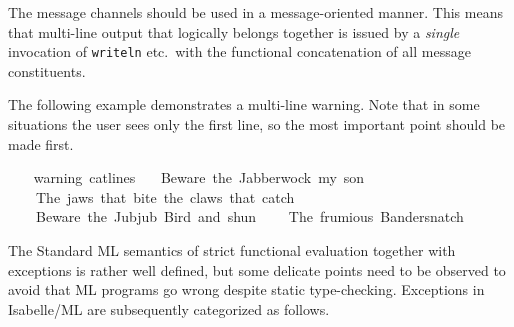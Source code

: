 \begin{isabellebody}
\begin{isamarkuptext}
  \begin{warn}
  The message channels should be used in a message-oriented manner.
  This means that multi-line output that logically belongs together is
  issued by a \emph{single} invocation of \verb|writeln| etc.\ with the
  functional concatenation of all message constituents.
  \end{warn}%
\end{isamarkuptext}%
\isamarkuptrue%
%
\endisatagmlref
{\isafoldmlref}%
%
\isadelimmlref
%
\endisadelimmlref
%
\isadelimmlex
%
\endisadelimmlex
%
\isatagmlex
%
\begin{isamarkuptext}%
The following example demonstrates a multi-line
  warning.  Note that in some situations the user sees only the first
  line, so the most important point should be made first.%
\end{isamarkuptext}%
\isamarkuptrue%
%
\endisatagmlex
{\isafoldmlex}%
%
\isadelimmlex
%
\endisadelimmlex
%
\isadelimML
%
\endisadelimML
%
\isatagML
{}\isamarkupfalse%
\ {}\isanewline
\ \ warning\ {}cat{}lines\isanewline
\ \ \ {}{}Beware\ the\ Jabberwock{}\ my\ son{}{}{}\isanewline
\ \ \ \ {}The\ jaws\ that\ bite{}\ the\ claws\ that\ catch{}{}{}\isanewline
\ \ \ \ {}Beware\ the\ Jubjub\ Bird{}\ and\ shun{}{}\isanewline
\ \ \ \ {}The\ frumious\ Bandersnatch{}{}{}{}{}\isanewline
{}%
\endisatagML
{\isafoldML}%
%
\isadelimML
%
\endisadelimML
%
\isamarkuptrue%
%
\begin{isamarkuptext}%
The Standard ML semantics of strict functional evaluation
  together with exceptions is rather well defined, but some delicate
  points need to be observed to avoid that ML programs go wrong
  despite static type-checking.  Exceptions in Isabelle/ML are
  subsequently categorized as follows.


\end{isamarkuptext}
\end{isabellebody}
